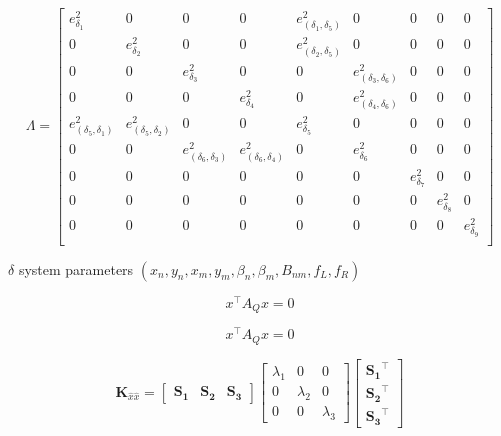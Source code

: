 \documentclass[5p,times,procedia]{elsarticle}
\begin{document}
\begin{equation}
\end{equation}

\begin{equation}
	\label{eqn:CovarianceMatrix}
	\Lambda = 
	\begin{bmatrix}
		e_{\delta_1}^2  & 0 & 0 & 0 & e_{(\delta_1,\delta_5)}^2 & 0 & 0 & 0 & 0 \\
		0  & e_{\delta_2}^2 & 0 & 0 & e_{(\delta_2,\delta_5)}^2 & 0 & 0 & 0 & 0 \\
		0 & 0 & e_{\delta_3}^2 & 0 & 0 & e_{(\delta_3,\delta_6)}^2 & 0 & 0 & 0 \\
		0 & 0 & 0 & e_{\delta_4}^2 & 0 & e_{(\delta_4,\delta_6)}^2 & 0 & 0 & 0 \\
		e_{(\delta_5,\delta_1)}^2 & e_{(\delta_5,\delta_2)}^2 & 0 & 0 & e_{\delta_5}^2 & 0 & 0 & 0 & 0 \\
		0 & 0 & e_{(\delta_6,\delta_3)}^2 & e_{(\delta_6,\delta_4)}^2 & 0 & e_{\delta_6}^2 & 0 & 0 & 0 \\
		0 & 0 & 0 & 0 & 0 & 0 & e_{\delta_7}^2 & 0 & 0 \\
		0 & 0 & 0 & 0 & 0 & 0 & 0 & e_{\delta_8}^2 & 0 \\
		0 & 0 & 0 & 0 & 0 & 0 & 0 & 0 & e_{\delta_9}^2 \\
	\end{bmatrix}
\end{equation}

$\delta$ system parameters $(x_n,y_n,x_m,y_m,\beta_n,\beta_m, B_{nm},f_{L},f_{R})$




\begin{equation}
	x^\top A_Q x = 0
\end{equation}

\begin{equation}
	x^\top A_Q x = 0
\end{equation}


\begin{equation}
	\label{eqn:CofactorM}
	\mathbf{K}_{\hat{x}\hat{x}}=
	\begin{bmatrix}	\mathbf{S_1} & \mathbf{S_2} & \mathbf{S_3}\end{bmatrix}
	\begin{bmatrix}
	 	 \lambda_{1}  & 0 & 0 \\
		0 &  \lambda_{2}  & 0\\
		0 & 0 &  \lambda_{3}
	\end{bmatrix}
	\begin{bmatrix}
		\mathbf{S_1}^\top \\
		\mathbf{S_2}^\top \\
		\mathbf{S_3}^\top
	\end{bmatrix}
\end{equation}
\end{document}
